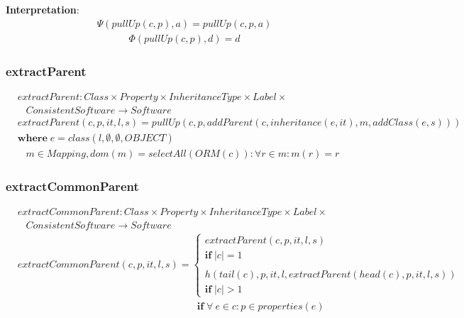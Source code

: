 \documentclass[10pt]{article}
\begin{document}
\noindent \textbf{Interpretation}:
\begin{align}
\Psi(pullUp(c, p), a) = pullUp(c, p, a)
\end{align}
\begin{align}
\Phi(pullUp(c, p), d) = d
\end{align}

\subsubsection{extractParent}
\begin{align}
& extractParent: Class \times Property \times InheritanceType \times Label \times  \nonumber \\
& \;\;\; ConsistentSoftware \rightarrow Software \\
& extractParent(c, p, it, l, s) = pullUp(c, p, addParent(c,inheritance(e, it), m,  addClass(e, s))) \\
& \mathbf{where} \; e = class(l, \emptyset, \emptyset, OBJECT)  \nonumber \\
& \;\;\; m \in Mapping, dom(m) = selectAll(ORM(c)) : \forall r \in m :  m(r) = r \nonumber
\end{align}


\subsubsection{extractCommonParent}
\begin{align}
& extractCommonParent: Class \times Property \times InheritanceType \times Label \times
\nonumber \\
& \;\;\; ConsistentSoftware \rightarrow Software \\
& extractCommonParent(c, p, it, l, s) = \begin{cases}
     extractParent(c, p, it, l, s) \\
     \mathbf{if} \; |c| = 1 \\\\
     h(tail(c), p, it, l, extractParent(head(c), p, it, l, s)) \\
       \mathbf{if} \; |c| > 1
 \end{cases} \\
& \;\;\;\;\;\;\;\;\;\;\;\;\;\;\;\;\;\;\;\;\;\;\;\;\;\;\;\;\;\;\;\;\;\;\;\;\;\;\;\;\;\;\;\;\;\;\;\;\;\;\;\;\;\;\;\;\;\;\;\;\;\;\;\;\; \mathbf{if} \; \forall \: e \in c : p \in properties(e)
\end{align}
\end{document}
